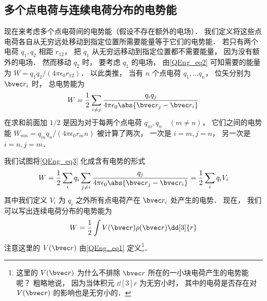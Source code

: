 \subsection{多个点电荷与连续电荷分布的电势能}
现在来考虑多个点电荷间的电势能（假设不存在额外的电场）． 我们定义将这些点电荷各自从无穷远处移动到指定位置所需要能量等于它们的电势能． 若只有两个电荷 $q_1, q_2$ 相距 $r_12$， 把 $q_1$ 从无穷远移动到指定位置都不需要能量， 因为没有额外的电场． 然而移动 $q_2$ 时， 要考虑 $q_1$ 的电场， 由\autoref{QEng_eq2} 可知需要的能量为 $W = q_1q_2/(4\pi\epsilon_0 r_12)$． 以此类推， 当有 $n$ 个点电荷 $q_1, \dots q_n$， 位矢分别为 $\bvec r_i$ 时， 总电势能为
\begin{equation}\label{QEng_eq3}
W = \frac12\sum_{i \neq j} \frac{q_i q_j}{4\pi\epsilon_0 \abs{\bvec r_j - \bvec r_i}}
\end{equation}
在求和前面加 $1/2$ 是因为对于每两个点电荷 $q_m, q_n\quad (m \neq n)$， 它们之间的电势能 $W_{mn} = q_m q_n/(4\pi\epsilon_0 r_mn)$ 被计算了两次， 一次是 $i = m, j = n$， 另一次是 $i = n, j = m$．

我们试图将\autoref{QEng_eq3} 化成含有电势的形式
\begin{equation}
W = \frac12 \sum_i q_i \sum_{j\neq i} \frac{q_j}{4\pi\epsilon_0\abs{\bvec r_j - \bvec r_i}}
=\frac12 \sum_i q_i V_i
\end{equation}
其中我们定义 $V_i$ 为 $q_i$ 之外所有点电荷产在 $\bvec r_i$ 处产生的电势． 现在， 我们可以写出连续电荷分布的电势能为
\begin{equation}\label{QEng_eq6}
W = \frac 12 \int V(\bvec r) \rho(\bvec r) \dd[3]{r}
\end{equation}
注意这里的 $V(\bvec r)$ 由\autoref{QEng_eq1} 定义\footnote{这里的 $V(\bvec r)$ 为什么不排除 $\bvec r$ 所在的一小块电荷产生的电势能呢？ 粗略地说， 因为当体积元 $\dd[3]{r}$ 为无穷小时， 其中的电荷是否存在对 $V(\bvec r)$ 的影响也是无穷小的．}．
